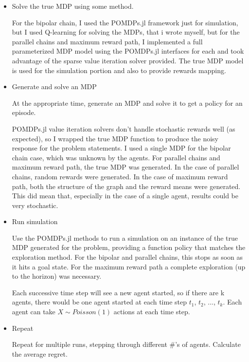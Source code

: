 \documentclass{article}
\begin{document}
  \begin{itemize}
  
\item Solve the true MDP using some method. 

For the bipolar chain, I used the POMDPs.jl framework just for simulation, but I used Q-learning for solving the MDPs, that i wrote myself, but for the parallel chains and maximum reward path, I implemented a full parameterized MDP model using the POMDPs.jl interfaces for each and took advantage of the sparse value iteration solver provided. The true MDP model is used for the simulation portion and also to provide rewards mapping. 

\item Generate and solve an MDP

At the appropriate time, generate an MDP and solve it to get a policy for an episode. 

POMDPs.jl value iteration solvers don't handle stochastic rewards well (as expected), so I wrapped the true MDP function to produce the noisy response for the problem statements. I used a single MDP for the bipolar chain case, which was unknown by the agents. For parallel chains and maximum reward path, the true MDP was generated. In the case of parallel chains, random rewards were generated. In the case of maximum reward path, both the structure of the graph and the reward means were generated. This did mean that, especially in the case of a single agent, results could be very stochastic.
  
\item Run simulation

Use the POMDPs.jl methods to run a simulation on an instance of the true MDP generated for the problem, providing a function policy that matches the exploration method. For the bipolar and parallel chains, this stops as soon as it hits a goal state. For the maximum reward path a complete exploration (up to the horizon) was necessary.

Each successive time step will see a new agent started, so if there are k agents, there would be one agent started at each time step $t_1$, $t_2$, ..., $t_k$. Each agent can take $X \sim Poisson(1)$  actions at each time step. 
\item Repeat

Repeat for multiple runs, stepping through different \#'s of agents. Calculate the average regret.

  
 \end{itemize}
 
\end{document}

